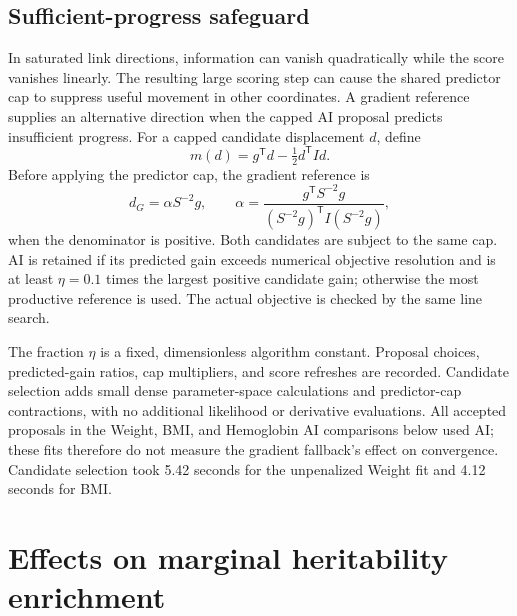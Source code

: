 \documentclass[11pt]{article}
\begin{document}
\subsection{Sufficient-progress safeguard}
In saturated link directions, information can vanish quadratically while the score vanishes linearly. The resulting large scoring step can cause the shared predictor cap to suppress useful movement in other coordinates. A gradient reference supplies an alternative direction when the capped AI proposal predicts insufficient progress. For a capped candidate displacement $d$, define
\begin{equation}
 m(d)=g^\mathsf{T}d-\tfrac12d^\mathsf{T}Id.
\end{equation}
Before applying the predictor cap, the gradient reference is
\begin{equation}
 d_G=\alpha S^{-2}g,\qquad
 \alpha=\frac{g^\mathsf{T}S^{-2}g}{(S^{-2}g)^\mathsf{T}I(S^{-2}g)},
\end{equation}
when the denominator is positive. Both candidates are subject to the same cap. AI is retained if its predicted gain exceeds numerical objective resolution and is at least $\eta=0.1$ times the largest positive candidate gain; otherwise the most productive reference is used. The actual objective is checked by the same line search.

The fraction $\eta$ is a fixed, dimensionless algorithm constant. Proposal choices, predicted-gain ratios, cap multipliers, and score refreshes are recorded. Candidate selection adds small dense parameter-space calculations and predictor-cap contractions, with no additional likelihood or derivative evaluations. All accepted proposals in the Weight, BMI, and Hemoglobin AI comparisons below used AI; these fits therefore do not measure the gradient fallback's effect on convergence. Candidate selection took 5.42 seconds for the unpenalized Weight fit and 4.12 seconds for BMI.

\section{Effects on marginal heritability enrichment}
\end{document}
